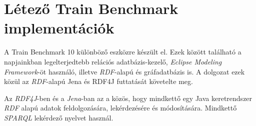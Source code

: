 \section{Létező Train Benchmark implementációk}

A Train Benchmark 10 különböző eszközre készült el. Ezek között található a napjainkban legelterjedtebb relációs adatbázis-kezelő\cite{DBEnginesRanking}, \emph{Eclipse Modeling Framework}\cite{EMF}-öt használó, illetve \emph{RDF}-alapú és gráfadatbázis is. A dolgozat ezek közül az \emph{RDF}-alapú Jena\cite{Jena} és  RDF4J\cite{RDF4J} futtatását követelte meg.

Az \emph{RDF4J}-ben és a \emph{Jena}-ban az a közös, hogy mindkettő egy Java keretrendszer \emph{RDF} alapú adatok feldolgozására, lekérdezésére és módosítására. Mindkettő \emph{SPARQL} lekérdező nyelvet használ.